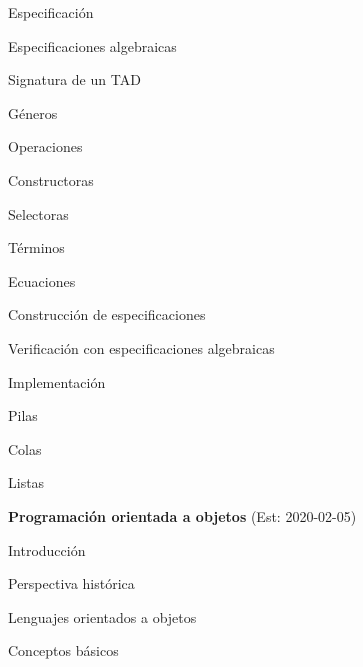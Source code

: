 \begin{longenum}
\begin{longenum}
\begin{longenum}
\begin{longenum}
            \end{longenum}
        \end{longenum}
        \item Especificación
        \begin{longenum}
            \item Especificaciones algebraicas
            \begin{longenum}
                \item Signatura de un TAD
                \begin{longenum}
                    \item Géneros
                    \item Operaciones
                    \begin{longenum}
                        \item Constructoras
                        \item Selectoras
                    \end{longenum}
                \end{longenum}
                \item Términos
                \item Ecuaciones
            \end{longenum}
            \item Construcción de especificaciones
            \item Verificación con especificaciones algebraicas
        \end{longenum}
        \item Implementación
        \begin{longenum}
            \item Pilas
            \item Colas
            \item Listas
        \end{longenum}
    \end{longenum}
    \item \textbf{Programación orientada a objetos}  (Est: 2020-02-05)
    \begin{longenum}
        \item Introducción
        \begin{longenum}
            \item Perspectiva histórica
            \item Lenguajes orientados a objetos
        \end{longenum}
        \item Conceptos básicos

\end{longenum}
\end{longenum}
